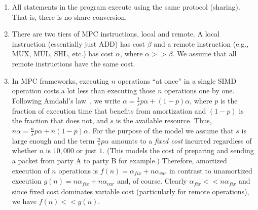 \begin{enumerate}
\item All statements in the program execute using the same protocol (sharing). That is, there is no share conversion.
\item There are two tiers of MPC instructions, local and remote. A local instruction (essentially just ADD) has cost $\beta$
and a remote instruction (e.g., MUX, MUL, SHL, etc.) has cost $\alpha$, where $\alpha >> \beta$. We assume that all remote
instructions have the same cost.
\item  In MPC frameworks, executing $n$ operations ``at once'' in a single SIMD operation costs a lot less than executing those $n$ operations one by one.
Following Amdahl's law~, we write $\alpha = \frac{1}{s}p\alpha + (1-p)\alpha$, where $p$ is the fraction of execution time that benefits from amortization and $(1-p)$
is the fraction that does not, and $s$ is the available resource. Thus, $n\alpha = \frac{n}{s}p\alpha + n(1-p)\alpha$.
For the purpose of the model we assume that $s$ is large enough and the term $\frac{n}{s}p\alpha$ amounts to a \emph{fixed cost} incurred regardless of
whether $n$ is $10,000$ or just $1$. (This models the cost of preparing and sending a packet from party A to party B for example.) Therefore, amortized execution
of $n$ operations is $f(n) = \alpha_\mathit{fix} + n\alpha_{var}$ in contrast to unamortized execution $g(n) = n\alpha_\mathit{fix} + n\alpha_{var}$ and, of course.
Clearly $\alpha_\mathit{fix} << n\alpha_\mathit{fix}$ and since fixed cost dominates variable cost (particularly for remote operations), we have $f(n) << g(n)$.

\end{enumerate}
